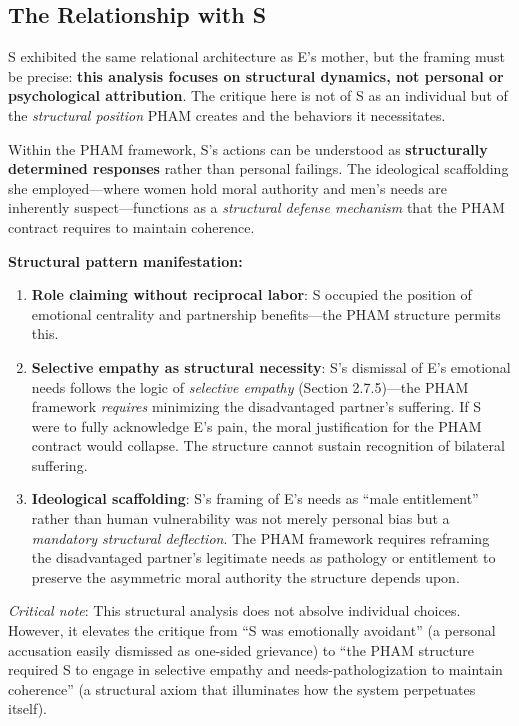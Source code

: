 \documentclass[12pt,openany]{book}
\numberwithin{equation}{chapter}
\begin{document}
\subsection{The Relationship with S}

S exhibited the same relational architecture as E's mother, but the framing must be precise: \textbf{this analysis focuses on structural dynamics, not personal or psychological attribution}. The critique here is not of S as an individual but of the \textit{structural position} PHAM creates and the behaviors it necessitates.

Within the PHAM framework, S's actions can be understood as \textbf{structurally determined responses} rather than personal failings. The ideological scaffolding she employed---where women hold moral authority and men's needs are inherently suspect---functions as a \textit{structural defense mechanism} that the PHAM contract requires to maintain coherence.

\textbf{Structural pattern manifestation:}
\begin{enumerate}
    \item \textbf{Role claiming without reciprocal labor}: S occupied the position of emotional centrality and partnership benefits---the PHAM structure permits this.
    
    \item \textbf{Selective empathy as structural necessity}: S's dismissal of E's emotional needs follows the logic of \textit{selective empathy} (Section 2.7.5)---the PHAM framework \textit{requires} minimizing the disadvantaged partner's suffering. If S were to fully acknowledge E's pain, the moral justification for the PHAM contract would collapse. The structure cannot sustain recognition of bilateral suffering.
    
    \item \textbf{Ideological scaffolding}: S's framing of E's needs as ``male entitlement'' rather than human vulnerability was not merely personal bias but a \textit{mandatory structural deflection}. The PHAM framework requires reframing the disadvantaged partner's legitimate needs as pathology or entitlement to preserve the asymmetric moral authority the structure depends upon.
\end{enumerate}

\textit{Critical note}: This structural analysis does not absolve individual choices. However, it elevates the critique from ``S was emotionally avoidant'' (a personal accusation easily dismissed as one-sided grievance) to ``the PHAM structure required S to engage in selective empathy and needs-pathologization to maintain coherence'' (a structural axiom that illuminates how the system perpetuates itself).
\end{document}
